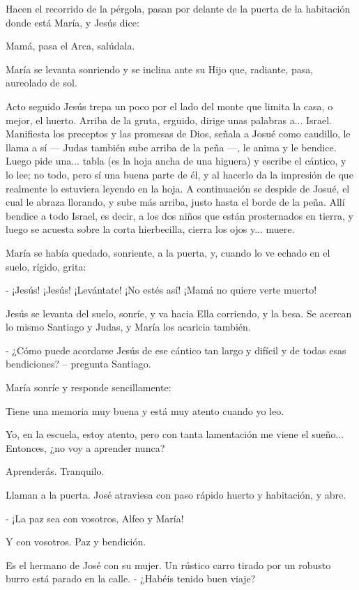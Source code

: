 \documentclass[12pt]{book} %
\begin{document}
Hacen el recorrido de la pérgola, pasan por delante de la puerta de la habitación donde está María, y Jesús dice: 

Mamá, pasa el Arca, salúdala. 

María se levanta sonriendo y se inclina ante su Hijo que, radiante, pasa, aureolado de sol. 

Acto seguido Jesús trepa un poco por el lado del monte que limita la casa, o mejor, el huerto. Arriba de la gruta, erguido, dirige unas palabras a... Israel. Manifiesta los preceptos y las promesas de Dios, señala a Josué como caudillo, le llama a sí — Judas también sube arriba de la peña —, le anima y le bendice. Luego pide una... tabla (es la hoja ancha de una higuera) y escribe el cántico, y lo lee; no todo, pero sí una buena parte de él, y al hacerlo da la impresión de que realmente lo estuviera leyendo en la hoja. A continuación se despide de Josué, el cual le abraza llorando, y sube más arriba, justo hasta el borde de la peña. Allí bendice a todo Israel, es decir, a los dos niños que están prosternados en tierra, y luego se acuesta sobre la corta hierbecilla, cierra los ojos y... muere. 

María se había quedado, sonriente, a la puerta, y, cuando lo ve echado en el suelo, rígido, grita: 

- ¡Jesús! ¡Jesús! ¡Levántate! ¡No estés así! ¡Mamá no quiere verte muerto! 

Jesús se levanta del suelo, sonríe, y va hacia Ella corriendo, y la besa. Se acercan lo mismo Santiago y Judas, y María los acaricia también. 

- ¿Cómo puede acordarse Jesús de ese cántico tan largo y difícil y de todas esas bendiciones? – pregunta Santiago. 

María sonríe y responde sencillamente: 

Tiene una memoria muy buena y está muy atento cuando yo leo. 

Yo, en la escuela, estoy atento, pero con tanta lamentación me viene el sueño... Entonces, ¿no voy a aprender nunca? 

Aprenderás. Tranquilo. 

Llaman a la puerta. José atraviesa con paso rápido huerto y habitación, y abre. 

- ¡La paz sea con vosotros, Alfeo y María! 

Y con vosotros. Paz y bendición. 

Es el hermano de José con su mujer. Un rústico carro tirado por un robusto burro está parado en la calle. - ¿Habéis tenido buen viaje? 
\end{document}

